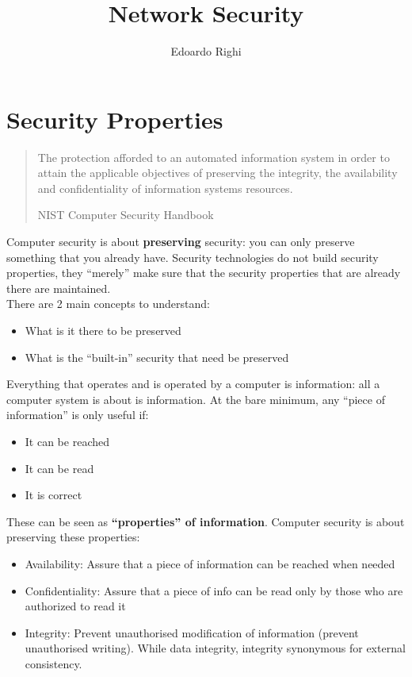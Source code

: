\documentclass[a4paper, 10pt, titlepage]{article}
\begin{document}
\title{Network Security}
\author{Edoardo Righi}
\maketitle
\thispagestyle{empty}
\tableofcontents
\newpage

\section{Security Properties}

\begin{quote}
The protection afforded to an automated information system in order to attain the applicable objectives of preserving the integrity, the availability and confidentiality of information systems resources.
\begin{flushright}
NIST Computer Security Handbook
\end{flushright}
\end{quote}	
Computer security is about \textbf{preserving} security: you can only preserve something that you already have. Security technologies do not build security properties, they “merely” make sure that the security properties that are already there are maintained.\\
There are 2 main concepts to understand:
\begin{itemize}
	\item What is it there to be preserved
	\item What is the “built-in” security that need be preserved
\end{itemize}
Everything that operates and is operated by a computer is information: all a computer system is about is information.
At the bare minimum, any “piece of information” is only useful if:
\begin{itemize}
	\item It can be reached
	\item It can be read
	\item It is correct
\end{itemize}
These can be seen as \textbf{“properties” of information}. Computer security is about preserving these properties:
\begin{itemize}
	\item Availability: Assure that a piece of information can be reached when needed
	\item Confidentiality: Assure that a piece of info can be read only by those who are authorized to read it
	\item Integrity: Prevent unauthorised modification of information (prevent unauthorised writing). While data integrity, integrity synonymous for external consistency.
\end{itemize}
\end{document}
